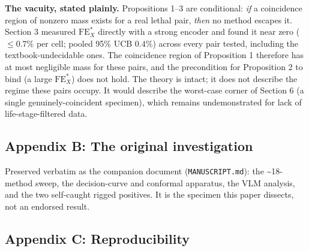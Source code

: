 \textbf{The vacuity, stated plainly.} Propositions 1--3 are conditional:
\emph{if} a coincidence region of nonzero mass exists for a real lethal
pair, \emph{then} no method escapes it. Section 3 measured
\(\mathrm{FE}^*_X\) directly with a strong encoder and found it near
zero (\(\le 0.7\%\) per cell; pooled 95\% UCB \(0.4\%\)) across every
pair tested, including the textbook-undecidable ones. The coincidence
region of Proposition 1 therefore has at most negligible mass for these
pairs, and the precondition for Proposition 2 to bind (a large
\(\mathrm{FE}^*_X\)) does not hold. The theory is intact; it does not
describe the regime these pairs occupy. It would describe the worst-case
corner of Section 6 (a single genuinely-coincident specimen), which
remains undemonstrated for lack of life-stage-filtered data.

\subsection{Appendix B: The original
investigation}\label{appendix-b-the-original-investigation}

Preserved verbatim as the companion document (\texttt{MANUSCRIPT.md}):
the \textasciitilde18-method sweep, the decision-curve and conformal
apparatus, the VLM analysis, and the two self-caught rigged positives.
It is the specimen this paper dissects, not an endorsed result.

\subsection{Appendix C:
Reproducibility}\label{appendix-c-reproducibility}

